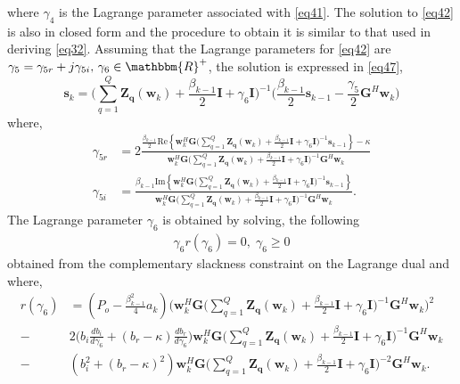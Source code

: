 \documentclass[11pt,draftclsnofoot,onecolumn]{IEEEtran}
\theoremstyle{definition}
\theoremstyle{remark}
\begin{document}
where $\gamma_4$ is the Lagrange parameter associated with \eqref{eq41}. The solution to \eqref{eq42} is also in closed form and the procedure to obtain it is similar to that used in deriving \eqref{eq32}. Assuming that the Lagrange parameters for \eqref{eq42} are $\gamma_5=\gamma_{5r}+j\gamma_{5i},\,\gamma_6\in\mathbbm{R}^{+}$, the solution is expressed in \eqref{eq47},
\begin{equation} \label{eq47}
\mathbf{s}_{k}=\big( \sum\limits_{q=1}^Q\mathbf{Z_q}(\mathbf{w}_{k})+\frac{\beta_{k-1}}{2}\mathbf{I}+\gamma_6\mathbf{I}\big)^{-1} \big(\frac{\beta_{k-1}}{2}\mathbf{s}_{k-1} -\frac{\gamma_5}{2}\mathbf{G}^H\mathbf{w}_{k}\big)
\end{equation}
where,
\begin{equation*}
\begin{aligned}
\gamma_{5r}&=2\frac{\frac{\beta_{k-1}} {2}\mathrm{Re} \left\{\mathbf{w}_{k}^H\mathbf{G} \big( \sum\limits_{q=1}^Q\mathbf{Z_q}(\mathbf{w}_{k})+\frac{\beta_{k-1}}{2}\mathbf{I}+\gamma_6\mathbf{I}\big)^{-1} \mathbf{s}_{k-1}\right\}-\kappa} {\mathbf{w}_{k}^H\mathbf{G} \big( \sum\limits_{q=1}^Q\mathbf{Z_q}(\mathbf{w}_{k})+\frac{\beta_{k-1}}{2}\mathbf{I}+\gamma_6\mathbf{I}\big)^{-1} \mathbf{G}^H\mathbf{w}_{k} } \\
\gamma_{5i}&=\frac{\beta_{k-1} \mathrm{Im} \left\{\mathbf{w}_{k}^H\mathbf{G} \big( \sum\limits_{q=1}^Q\mathbf{Z_q}(\mathbf{w}_{k})+\frac{\beta_{k-1}}{2}\mathbf{I}+\gamma_6\mathbf{I}\big)^{-1} \mathbf{s}_{k-1}\right\} }{\mathbf{w}_{k}^H\mathbf{G} \big( \sum\limits_{q=1}^Q\mathbf{Z_q}(\mathbf{w}_{k})+\frac{\beta_{k-1}}{2}\mathbf{I}+\gamma_6\mathbf{I}\big)^{-1} \mathbf{G}^H\mathbf{w}_{k} }.
\end{aligned}
\end{equation*}
The Lagrange parameter $\gamma_6$ is obtained by solving, the following
\begin{align}\label{eq48}
\gamma_6 r(\gamma_6)=0,\;\gamma_6\geq0
\end{align}
obtained from the complementary slackness constraint on the Lagrange dual and where,
\begin{equation*}
\begin{aligned} r(\gamma_6)&=(P_o-\frac{\beta_{k-1}^2}{4} a_k) \bigg( \mathbf{w}_{k}^H\mathbf{G} \big( \sum\limits_{q=1}^Q\mathbf{Z_q}(\mathbf{w}_{k})+\frac{\beta_{k-1}}{2}\mathbf{I}+\gamma_6\mathbf{I}\big)^{-1} \mathbf{G}^H\mathbf{w}_{k} \bigg)^2 \\
-&2\big( b_i\frac{db_i}{d\gamma_6} +(b_r-\kappa) \frac{db_r}{d\gamma_6}\big) \mathbf{w}_{k}^H\mathbf{G} \big( \sum\limits_{q=1}^Q\mathbf{Z_q}(\mathbf{w}_{k})+\frac{\beta_{k-1}}{2}\mathbf{I}+\gamma_6\mathbf{I}\big)^{-1} \mathbf{G}^H\mathbf{w}_{k}  \\
-&(b_{i}^2+(b_r-\kappa)^2) \mathbf{w}_{k}^H\mathbf{G} \big( \sum\limits_{q=1}^Q\mathbf{Z_q}(\mathbf{w}_{k})+\frac{\beta_{k-1}}{2}\mathbf{I}+\gamma_6\mathbf{I}\big)^{-2} \mathbf{G}^H\mathbf{w}_{k}.
\end{aligned} 
\end{equation*}
\end{document}
